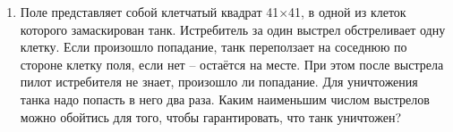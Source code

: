 \documentclass{article}
\begin{document}
\begin{enumerate}[label*=\protect\fbox{\arabic{enumi}}]
		\item Поле представляет собой клетчатый квадрат 41×41, в одной из клеток которого замаскирован танк. Истребитель за один выстрел обстреливает одну клетку. Если произошло попадание, танк переползает на соседнюю по стороне клетку поля, если нет – остаётся на месте. При этом после выстрела пилот истребителя не знает, произошло ли попадание. Для уничтожения танка надо попасть в него два раза. Каким наименьшим числом выстрелов можно обойтись для того, чтобы гарантировать, что танк уничтожен? 
		
	\end{enumerate}
\end{document}
